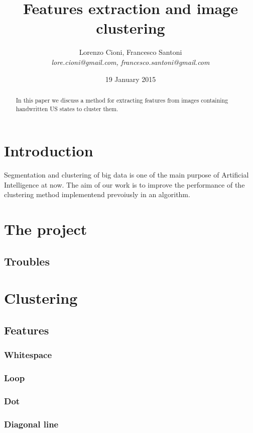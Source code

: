 \documentclass[a4paper,12pt]{article}
\title{\bf Features extraction and image clustering}
\date {19 January 2015}
\author{Lorenzo Cioni, Francesco Santoni\\\textit{{\small lore.cioni@gmail.com, francesco.santoni@gmail.com}}}
\begin{document}
\maketitle

\begin{abstract}
In this paper we discuss a method for extracting features from images containing handwritten US states to cluster them.
\end{abstract}

\tableofcontents

\section{Introduction}
Segmentation and clustering of big data is one of the main purpose of Artificial Intelligence at now. 
The aim of our work is to improve the performance of the clustering method implementend prevoiusly in an algorithm.

\section{The project}

\subsection{Troubles}

\section{Clustering}



\subsection{Features}

\subsubsection{Whitespace}  

\subsubsection{Loop}

\subsubsection{Dot}

\subsubsection{Diagonal line}
\end{document}
